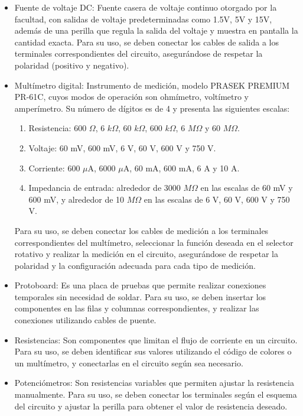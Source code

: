 \documentclass[12pt,a4paper]{article}
\begin{document}
\begin{itemize}
    \item Fuente de voltaje DC: Fuente casera de voltaje continuo otorgado por la facultad, con salidas de voltaje predeterminadas como 1.5V, 5V y 15V, además de una perilla que regula la salida del voltaje y muestra en pantalla la cantidad exacta. Para su uso, se deben conectar los cables de salida a los terminales correspondientes del circuito, asegurándose de respetar la polaridad (positivo y negativo).
    \item Multímetro digital: Instrumento de medición, modelo PRASEK PREMIUM PR-61C, cuyos modos de operación son ohmímetro, voltímetro y amperímetro. Su número de dígitos es de 4 y presenta las siguientes escalas:
    \begin{enumerate}
        \item Resistencia: 600 $\Omega$, 6 $k\Omega$, 60 $k\Omega$, 600 $k\Omega$, 6 $M\Omega$ y 60 $M\Omega$.
        \item Voltaje: 60 mV, 600 mV, 6 V, 60 V, 600 V y 750 V.
        \item Corriente: 600 $\mu$A, 6000 $\mu$A, 60 mA, 600 mA, 6 A y 10 A.
        \item Impedancia de entrada: alrededor de 3000 $M\Omega$ en las escalas de 60 mV y 600 mV, y alrededor de 10 $M\Omega$ en las escalas de 6 V, 60 V, 600 V y 750 V.
    \end{enumerate}
    \newpage
    Para su uso, se deben conectar los cables de medición a los terminales correspondientes del multímetro, seleccionar la función deseada en el selector rotativo y realizar la medición en el circuito, asegurándose de respetar la polaridad y la configuración adecuada para cada tipo de medición.
    \item Protoboard: Es una placa de pruebas que permite realizar conexiones temporales sin necesidad de soldar. Para su uso, se deben insertar los componentes en las filas y columnas correspondientes, y realizar las conexiones utilizando cables de puente.
    \item Resistencias: Son componentes que limitan el flujo de corriente en un circuito. Para su uso, se deben identificar sus valores utilizando el código de colores o un multímetro, y conectarlas en el circuito según sea necesario.
    \item Potenciómetros: Son resistencias variables que permiten ajustar la resistencia manualmente. Para su uso, se deben conectar los terminales según el esquema del circuito y ajustar la perilla para obtener el valor de resistencia deseado.
\end{itemize}
\end{document}
